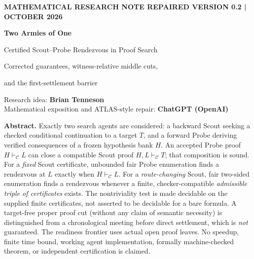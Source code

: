 \documentclass[11pt,letterpaper]{article}
\theoremstyle{definition}
\newcommand{\vdC}{\vdash_{\mathcal C}}
\begin{document}
\thispagestyle{plain}
\vspace*{.18in}
{\small\sffamily\bfseries\color{Probe} MATHEMATICAL RESEARCH NOTE \hfill REPAIRED VERSION 0.2\; | OCTOBER 2026}\par
\vspace{.30in}
{\color{Ink}\bfseries\fontsize{25}{29}\selectfont Two Armies of One}\par
\vspace{.11in}
{\color{Ink}\fontsize{16}{21}\selectfont Certified Scout--Probe Rendezvous in Proof Search}\par
\vspace{.12in}
{\color{Scout}\large Corrected guarantees, witness-relative middle cuts,\par and the first-settlement barrier}\par
\vspace{.26in}
{\color{Ink}\small Research idea: \textbf{Brian Tenneson}\\ Mathematical exposition and ATLAS-style repair: \textbf{ChatGPT (OpenAI)}}\par
\vspace{.15in}
{}\par
\vspace{.27in}
\begin{keybox}
\textbf{Abstract.} Exactly two search agents are considered: a backward Scout seeking a
checked conditional continuation to a target $T$, and a forward Probe deriving
verified consequences of a frozen hypothesis bank $H$. An accepted Probe proof
$H\vdC L$ can close a compatible Scout proof $H,L\vdC T$; that composition
is sound. For a \emph{fixed} Scout certificate, unbounded fair Probe enumeration
finds a rendezvous at $L$ exactly when $H\vdC L$. For a \emph{route-changing}
Scout, fair two-sided enumeration finds a rendezvous whenever a finite,
checker-compatible \emph{admissible triple of certificates} exists. The
nontriviality test is made decidable on the supplied finite certificates,
not asserted to be decidable for a bare formula. A target-free proper proof cut
(without any claim of semantic necessity) is distinguished from a chronological meeting before direct settlement, which
is \emph{not} guaranteed. The readiness frontier uses actual open proof leaves.
No speedup, finite time bound, working agent implementation, formally
machine-checked theorem, or independent certification is claimed.
\end{keybox}
\end{document}
